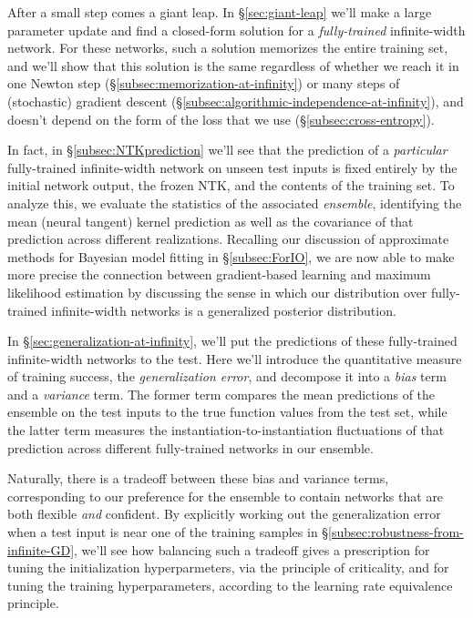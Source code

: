 After a small step comes a giant leap. In \S\ref{sec:giant-leap} we'll make a large parameter update and find a closed-form solution for a \emph{fully-trained} infinite-width network. For these networks, such a solution memorizes the entire training set, and we'll show that this solution is the same regardless of whether we reach it in one Newton step (\S\ref{subsec:memorization-at-infinity}) or many steps of (stochastic) gradient descent (\S\ref{subsec:algorithmic-independence-at-infinity}), and doesn't depend on the form of the loss that we use (\S\ref{subsec:cross-entropy}). 

In 
fact, in \S\ref{subsec:NTKprediction} we'll see that the prediction of a \emph{particular} fully-trained infinite-width network on unseen test inputs is fixed entirely by the initial network output, the frozen NTK, and the contents of the training set. To analyze this, we evaluate the statistics of the associated \emph{ensemble}, identifying the mean (neural tangent) kernel prediction as well as the covariance of that prediction across different realizations. Recalling our discussion of approximate methods for Bayesian model fitting in \S\ref{subsec:ForIO}, we are now able to make more precise the connection between gradient-based learning and maximum likelihood estimation by discussing the sense in which our distribution over fully-trained infinite-width networks is a generalized posterior distribution.










In \S\ref{sec:generalization-at-infinity}, we'll put the predictions of these fully-trained infinite-width networks to the test. Here we'll introduce the quantitative measure of training success, the \emph{generalization error}, and decompose it into a \emph{bias} term and a \emph{variance} term. The former term compares the mean predictions of the ensemble on the test inputs to the true function values from the test set, while the latter term measures the instantiation-to-instantiation fluctuations of that prediction across different fully-trained networks in our ensemble. 





Naturally, there is a tradeoff between these bias and variance terms, corresponding to our preference for the ensemble to contain networks that are both flexible \emph{and} confident. By explicitly working out the generalization error when a test input is near one of the training samples in \S\ref{subsec:robustness-from-infinite-GD}, we'll see how balancing such a tradeoff gives a prescription for tuning the initialization hyperparmeters, via the principle of criticality, and for tuning the training hyperparameters, according to the learning rate equivalence principle. 

